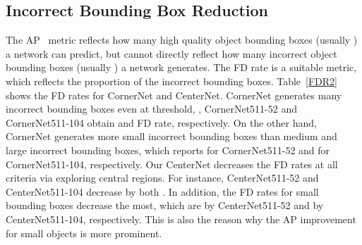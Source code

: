 \documentclass[10pt,twocolumn,letterpaper]{article}
\begin{document}
\subsection{Incorrect Bounding Box Reduction}
The AP~\cite{lin2014microsoft} metric reflects how many high quality object bounding boxes (usually ) a network can predict, but cannot directly reflect how many incorrect object bounding boxes (usually ) a network generates. The FD rate is a suitable metric, which reflects the proportion of the incorrect bounding boxes. Table~\ref{FDR2} shows the FD rates for CornerNet and CenterNet. CornerNet generates many incorrect bounding boxes even at  threshold, \ie, CornerNet511-52 and CornerNet511-104 obtain  and  FD rate, respectively. On the other hand, CornerNet generates more small incorrect bounding boxes than medium and large incorrect bounding boxes, which reports  for CornerNet511-52 and  for CornerNet511-104, respectively. Our CenterNet decreases the FD rates at all criteria via exploring central regions. For instance, CenterNet511-52 and CenterNet511-104 decrease  by both . In addition, the FD rates for small bounding boxes decrease the most, which are  by CenterNet511-52 and  by CenterNet511-104, respectively. This is also the reason why the AP improvement for small objects is more prominent.
\begin{table}[tb]
\centering
{}
\vspace{-2ex}
\caption{Comparison of false discovery rates () of CornerNet and CenterNet on the MS-COCO validation dataset. The results suggest CenterNet avoids a large number of incorrect bounding boxes, especially for small incorrect bounding boxes.}
\label{FDR2}
\vspace{-4ex}
\end{table}
\end{document}

